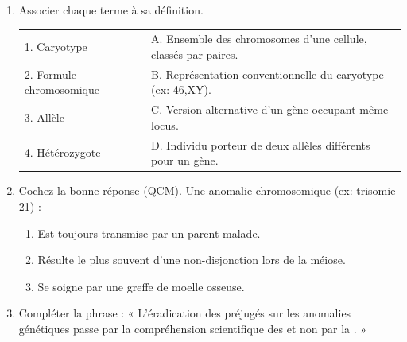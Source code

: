 \documentclass[11pt]{article}
\begin{document}
\begin{exercice}
\begin{enumerate}
    \item Associer chaque terme à sa définition.
    \begin{tabular}{ll}
    1. Caryotype & A. Ensemble des chromosomes d'une cellule, classés par paires. \\
    2. Formule chromosomique & B. Représentation conventionnelle du caryotype (ex: 46,XY). \\
    3. Allèle & C. Version alternative d'un gène occupant même locus. \\
    4. Hétérozygote & D. Individu porteur de deux allèles différents pour un gène.
    \end{tabular}
    \item Cochez la bonne réponse (QCM). Une anomalie chromosomique (ex: trisomie 21) :
    \begin{enumerate}
        \item Est toujours transmise par un parent malade.
        \item Résulte le plus souvent d'une non-disjonction lors de la méiose.
        \item Se soigne par une greffe de moelle osseuse.
    \end{enumerate}
    \item Compléter la phrase : « L'éradication des préjugés sur les anomalies génétiques passe par la compréhension scientifique des \underline{\hspace{4cm}} et non par la \underline{\hspace{4cm}}. »
\end{enumerate}
\end{exercice}
\end{document}
